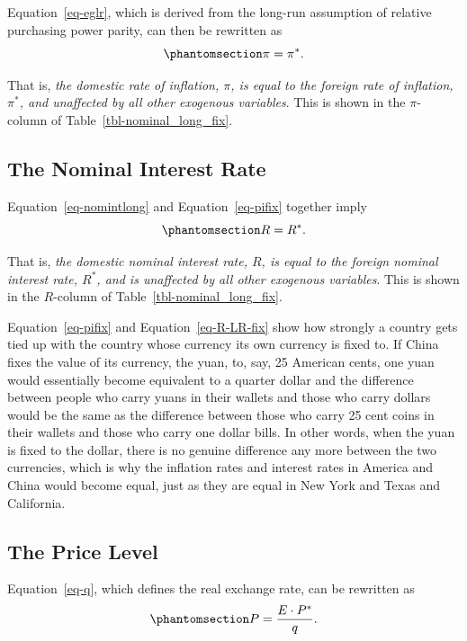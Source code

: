 \documentclass[
  letterpaper,
]{book}
\theoremstyle{plain}
\theoremstyle{remark}
\begin{document}
Equation~\ref{eq-eglr}, which is derived from the long-run assumption of
relative purchasing power parity, can then be rewritten as
\begin{equation}\phantomsection\label{eq-pifix}{
\pi=\pi^*.
}\end{equation}

That is, \emph{the domestic rate of inflation, \(\pi\), is equal to the
foreign rate of inflation, \(\pi^*\), and unaffected by all other
exogenous variables}. This is shown in the \(\pi\)-column of
Table~\ref{tbl-nominal_long_fix}.

\subsection{The Nominal Interest Rate}\label{sec-R-LR-fix}

Equation~\ref{eq-nomintlong} and Equation~\ref{eq-pifix} together imply
\begin{equation}\phantomsection\label{eq-R-LR-fix}{
R=R^*.
}\end{equation}

That is, \emph{the domestic nominal interest rate, \(R\), is equal to
the foreign nominal interest rate, \(R^*\), and is unaffected by all
other exogenous variables}. This is shown in the \(R\)-column of
Table~\ref{tbl-nominal_long_fix}.

Equation~\ref{eq-pifix} and Equation~\ref{eq-R-LR-fix} show how strongly
a country gets tied up with the country whose currency its own currency
is fixed to. If China fixes the value of its currency, the yuan, to,
say, 25 American cents, one yuan would essentially become equivalent to
a quarter dollar and the difference between people who carry yuans in
their wallets and those who carry dollars would be the same as the
difference between those who carry 25 cent coins in their wallets and
those who carry one dollar bills. In other words, when the yuan is fixed
to the dollar, there is no genuine difference any more between the two
currencies, which is why the inflation rates and interest rates in
America and China would become equal, just as they are equal in New York
and Texas and California.

\subsection{The Price Level}\label{sec-pfix}

Equation~\ref{eq-q}, which defines the real exchange rate, can be
rewritten as \begin{equation}\phantomsection\label{eq-pfix}{
P=\frac {E\cdot P^*}{q}.
}\end{equation}
\end{document}
